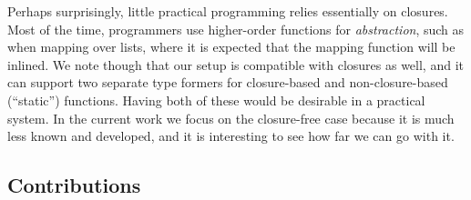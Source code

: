 \documentclass[acmsmall,screen,review,anonymous]{acmart}
\theoremstyle{remark}
\begin{document}
Perhaps surprisingly, little practical programming relies essentially on
closures. Most of the time, programmers use higher-order functions for
\emph{abstraction}, such as when mapping over lists, where it is expected that
the mapping function will be inlined. We note though that our setup is
compatible with closures as well, and it can support two separate type formers
for closure-based and non-closure-based (``static'') functions. Having both of
these would be desirable in a practical system. In the current work we focus on
the closure-free case because it is much less known and developed, and it is
interesting to see how far we can go with it.



\subsection{Contributions}
\end{document}
